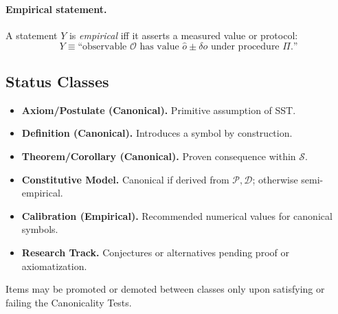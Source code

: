 \documentclass[10pt,reprint,aps,onecolumn,nofootinbib]{revtex4-2}
\begin{document}
        \paragraph{Empirical statement.}
            A statement $Y$ is \emph{empirical} iff it asserts a measured value or protocol:
            \[
                Y \equiv \text{``observable $\mathcal{O}$ has value $\hat{o}\pm\delta o$ under procedure $\Pi$.''}
            \]
    \subsection*{Status Classes}
    \begin{itemize}
        \item \textbf{Axiom/Postulate (Canonical).} Primitive assumption of SST.
        \item \textbf{Definition (Canonical).} Introduces a symbol by construction.
        \item \textbf{Theorem/Corollary (Canonical).} Proven consequence within $\mathcal{S}$.
        \item \textbf{Constitutive Model.} Canonical if derived from $\mathcal{P},\mathcal{D}$; otherwise semi-empirical.
        \item \textbf{Calibration (Empirical).} Recommended numerical values for canonical symbols.
        \item \textbf{Research Track.} Conjectures or alternatives pending proof or axiomatization.
    \end{itemize}
    Items may be promoted or demoted between classes only upon satisfying or failing the Canonicality Tests.
\end{document}
